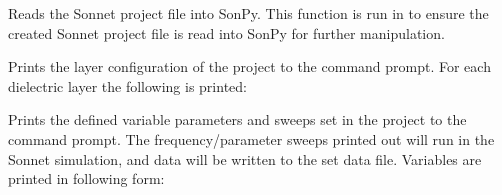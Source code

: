 \documentclass[letterpaper,10pt,english,openany]{sphinxmanual}
\begin{document}
\begin{fulllineitems}
\begin{fulllineitems}
\begin{quote}
\begin{description}
\end{description}\end{quote}

\end{fulllineitems}


\begin{fulllineitems}
\label{\detokenize{source/sonpy:sonpy.sonnet.readProject}}
Reads the Sonnet project file into SonPy. This function is run in {\hyperref[\detokenize{source/sonpy:sonpy.sonnet.runGdsTranslator}]{}} to ensure the created Sonnet project file is read into SonPy for further manipulation.

\end{fulllineitems}


\begin{fulllineitems}
\label{\detokenize{source/sonpy:sonpy.sonnet.printLayers}}
Prints the layer configuration of the project to the command prompt. For each dielectric layer the following is printed:

%
\begin{sphinxVerbatim}[commandchars=\\\{\}]
    
    
               
          
\end{sphinxVerbatim}

\end{fulllineitems}


\begin{fulllineitems}
\label{\detokenize{source/sonpy:sonpy.sonnet.printParameters}}
Prints the defined variable parameters and sweeps set in the project to the command prompt. The frequency/parameter sweeps printed out will run in the Sonnet simulation, and data will be written to the set data file. Variables are printed in following form:


\end{fulllineitems}
\end{fulllineitems}
\end{document}
